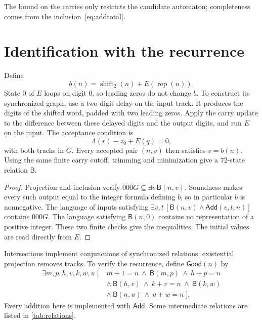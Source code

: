 \documentclass[11pt,a4paper]{article}
\numberwithin{equation}{section}
\newtheorem{proposition}[theorem]{Proposition}
\theoremstyle{remark}
\newcommand{\rep}{\operatorname{rep}}
\newcommand{\sh}{\operatorname{shift}_2}
\newcommand{\Add}{\mathsf{Add}}
\newcommand{\Graph}{\mathsf{B}}
\newcommand{\Good}{\mathsf{Good}}
\begin{document}
The bound on the carries only restricts the candidate automaton;
completeness comes from the inclusion~\eqref{eq:addtotal}.

\section{Identification with the recurrence}\label{sec:identification}
Define
\[
 b(n)=\sh(n)+E(\rep(n)).
\]
State $0$ of $E$ loops on digit $0$, so leading zeros do not change $b$.
To construct its synchronized graph, use a two-digit delay on the input
track. It produces the digits of the shifted word, padded with two leading
zeros. Apply the carry update to the difference between these delayed digits
and the output digits, and run $E$ on the input. The acceptance condition is
\[
 \Lambda(r)-z_0+E(q)=0,
\]
with both tracks in $G$. Every accepted pair $(n,v)$ then satisfies $v=b(n)$.
Using the same finite carry cutoff, trimming and minimization give a
$72$-state relation $\Graph$.

\begin{proof}
Projection and inclusion verify
$000G\subseteq\exists v\,\Graph(n,v)$. Soundness makes every such output
equal to the integer formula defining $b$, so in particular $b$ is
nonnegative. The language of inputs satisfying
$\exists v,t\,[\Graph(n,v)\wedge\Add(v,t,n)]$ contains $000G$.
The language satisfying $\Graph(n,0)$ contains no representation of a
positive integer. These two finite checks give the inequalities.
The initial values are read directly from $E$.
\end{proof}

Intersections implement conjunctions of synchronized relations; existential
projection removes tracks. To verify the recurrence, define $\Good(n)$ by
\begin{equation}\label{eq:good}
\begin{split}
\exists m,p,h,v,k,w,u\;[\;&m+1=n\ \wedge\ \Graph(m,p)
 \ \wedge\ h+p=n\\
 &\wedge\ \Graph(h,v)\ \wedge\ k+v=n
 \ \wedge\ \Graph(k,w)\\
 &\wedge\ \Graph(n,u)\ \wedge\ u+w=n\;].
\end{split}
\end{equation}
Every addition here is implemented with $\Add$. Some intermediate relations
are listed in \cref{tab:relations}.
\end{document}
